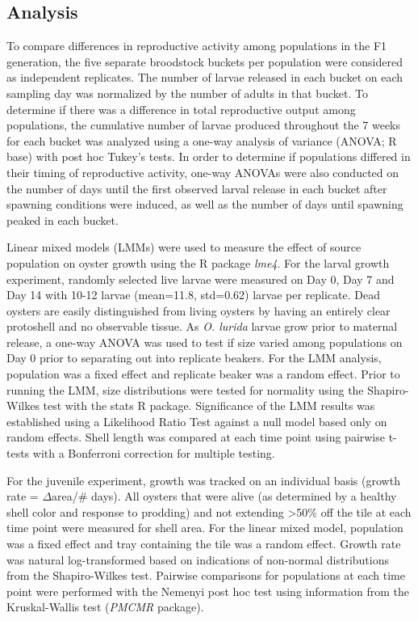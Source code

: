 \documentclass[fleqn,10pt]{wlscirep}
\begin{document}
\subsection*{Analysis}
To compare differences in reproductive activity among populations in the F1 generation, the five separate broodstock buckets per population were considered as independent replicates. The number of larvae released in each bucket on each sampling day was normalized by the number of adults in that bucket. To determine if there was a difference in total reproductive output among populations, the cumulative number of larvae produced throughout the 7 weeks for each bucket was analyzed using a one-way analysis of variance (ANOVA; R base) with post hoc Tukey's tests. In order to determine if populations differed in their timing of reproductive activity, one-way ANOVAs were also conducted on the number of days until the first observed larval release in each bucket after spawning conditions were induced, as well as the number of days until spawning peaked in each bucket.\par 
Linear mixed models (LMMs) were used to measure the effect of source population on oyster growth using the R package \textit{lme4}\cite{Bates2015-ky}. For the larval growth experiment, randomly selected live larvae were measured on Day 0, Day 7 and Day 14 with 10-12 larvae (mean=11.8, std=0.62) larvae per replicate. Dead oysters are easily distinguished from living oysters by having an entirely clear protoshell and no observable tissue. As \textit{O. lurida} larvae grow prior to maternal release, a one-way ANOVA was used to test if size varied among populations on Day 0 prior to separating out into replicate beakers. For the LMM analysis, population was a fixed effect and replicate beaker was a random effect. Prior to running the LMM, size distributions were tested for normality using the Shapiro-Wilkes test with the stats R package. Significance of the LMM results was established using a Likelihood Ratio Test against a null model based only on random effects. Shell length was compared at each time point using pairwise t-tests with a Bonferroni correction for multiple testing. \par 
For the juvenile experiment, growth was tracked on an individual basis (growth rate = $\Delta$area/\# days). All oysters that were alive (as determined by a healthy shell color and response to prodding) and not extending >50\% off the tile at each time point were measured for shell area. For the linear mixed model, population was a fixed effect and tray containing the tile was a random effect. Growth rate was natural log-transformed based on indications of non-normal distributions from the Shapiro-Wilkes test. Pairwise comparisons for populations at each time point were performed with the Nemenyi post hoc test using information from the Kruskal-Wallis test (\textit{PMCMR} package)\cite{Pohlert2014-lr}.
\end{document}
